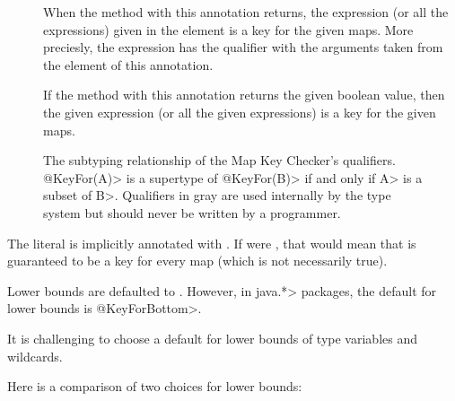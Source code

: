 \begin{description}
\item[]
  When the method with this annotation returns, the expression (or all the
  expressions) given in the  element is a key for the given
  maps. More preciesly, the expression has the  qualifier
  with the  arguments taken from the  element
  of this annotation.
\item[]
  If the method with this annotation returns the given boolean value,
  then the given expression (or all the given expressions)
  is a key for the given maps.
\end{description}

\begin{figure}
\caption{The subtyping relationship of the Map Key Checker's qualifiers.
\<@KeyFor(A)> is a supertype of \<@KeyFor(B)> if and only if \<A> is a subset of
\<B>.  Qualifiers in gray are used internally by the type system but should
never be written by a programmer.}
\label{fig-map-key-keyfor-hierarchy}
\end{figure}


The  literal is implicitly annotated with .
If  were , that would mean that
 is guaranteed to be a key for every map (which is not
necessarily true).


Lower bounds are defaulted to .
However, in \<java.*> packages, the default for lower bounds is
\<@KeyForBottom>.

It is challenging to choose a default for lower bounds of type variables
and wildcards.

Here is a comparison of two choices for lower bounds:

\medskip

